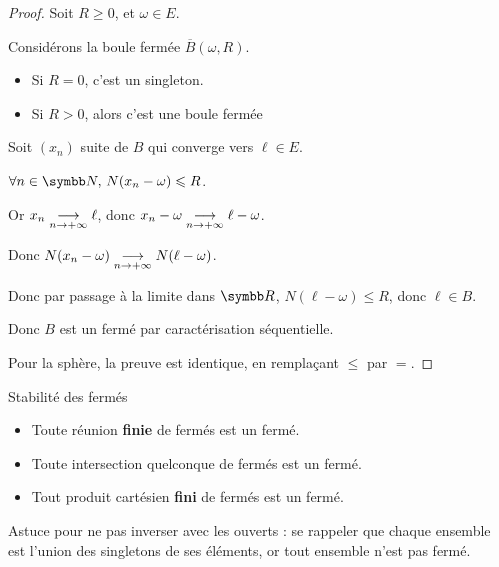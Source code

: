 \begin{proof}
    Soit $R \geqslant 0$, et $\omega \in E$.

    Considérons la boule fermée $\overline{B}(\omega, R)$.

    \begin{itemize}
        \item Si $R = 0$, c'est un singleton. 
        \item Si $R > 0$, alors c'est une boule fermée
    \end{itemize}

    Soit $(x_n)$ suite de $B$ qui converge vers $\ell \in E$.

    $\forall n \in \N, \, N(x_n - \omega) \leqslant R$.

    Or $x_n \underset{n \to + \infty}{\longrightarrow} \ell$, donc $x_n - \omega \underset{n \to + \infty}{\longrightarrow} \ell - \omega$.

    Donc $N(x_n - \omega) \underset{n \to + \infty}{\longrightarrow} N(\ell - \omega)$.

    Donc par passage à la limite dans $\R$, $N(\ell - \omega ) \leqslant R$, donc $\ell \in B$.

    Donc $B$ est un fermé par caractérisation séquentielle.

    Pour la sphère, la preuve est identique, en remplaçant $\leqslant$ par $=$.
\end{proof}

\begin{proposition}{Stabilité des fermés}{}
    \begin{itemize}
        \item Toute réunion \textbf{finie} de fermés est un fermé.
        \item Toute intersection quelconque de fermés est un fermé.
        \item Tout produit cartésien \textbf{fini} de fermés est un fermé.
    \end{itemize}
\end{proposition}

Astuce pour ne pas inverser avec les ouverts : se rappeler que chaque ensemble est l'union des singletons 
de ses éléments, or tout ensemble n'est pas fermé. 


